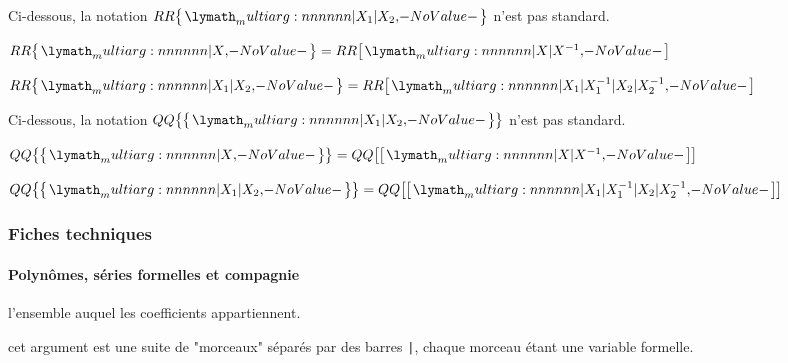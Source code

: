 \documentclass[12pt,a4paper]{article}
\newcommand\QQ{QQ}
\newcommand\RR{RR}
\begin{document}

Ci-dessous, la notation $\setpolylaurent{\RR}{X_1 | X_2}$ n'est pas standard.

\begin{latexex}
 $\setpolylaurent{\RR}{X}
= \setpoly{\RR}{X | X^{-1}}$

 $\setpolylaurent{\RR}{X_1 | X_2}
= \setpoly{\RR}%
          {X_1 | X_1^{-1} %
         | X_2 | X_2^{-1}}$
\end{latexex}





Ci-dessous, la notation $\setserielaurent{\QQ}{X_1 | X_2}$ n'est pas standard.

\begin{latexex}
 $\setserielaurent{\QQ}{X}
= \setserie{\QQ}{X | X^{-1}}$

 $\setserielaurent{\QQ}{X_1 | X_2} 
= \setserie{\QQ}%
           {X_1 | X_1^{-1} %
          | X_2 | X_2^{-1}}$
\end{latexex}




\subsubsection{Fiches techniques}

\paragraph{Polynômes, séries formelles et compagnie}



\extraspace



\extraspace



 l'ensemble auquel les coefficients appartiennent.

 cet argument est une suite de "morceaux" séparés par des barres \verb+|+, chaque morceau étant une variable formelle.
\end{document}
